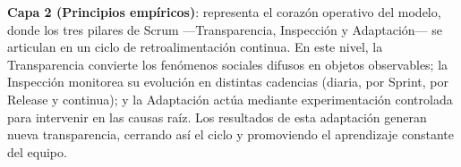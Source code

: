 \FloatBarrier

\textbf{Capa 2 (Principios empíricos)}: representa el corazón operativo del modelo, donde los tres pilares de Scrum —Transparencia, Inspección y Adaptación— se articulan en un ciclo de retroalimentación continua.
En este nivel, la Transparencia convierte los fenómenos sociales difusos en objetos observables; la Inspección monitorea su evolución en distintas cadencias (diaria, por Sprint, por Release y continua); y la Adaptación actúa mediante experimentación controlada para intervenir en las causas raíz.
Los resultados de esta adaptación generan nueva transparencia, cerrando así el ciclo y promoviendo el aprendizaje constante del equipo.

\vspace{1em}

